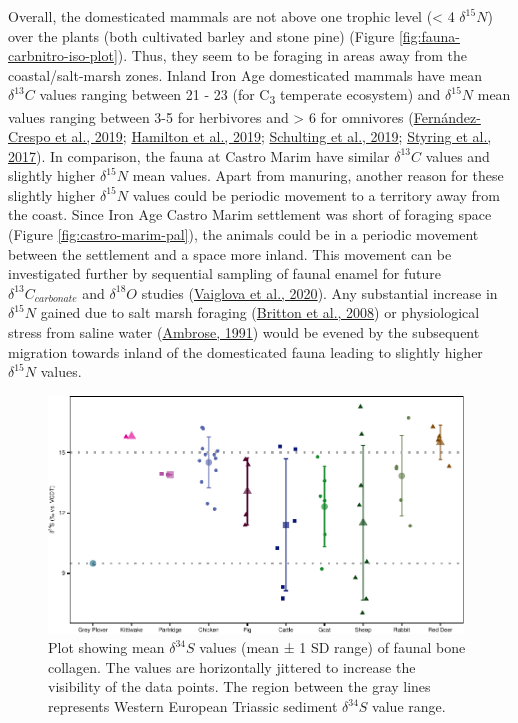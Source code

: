 \documentclass[3p]{elsarticle} %
\begin{document}
Overall, the domesticated mammals are not above one trophic level (\textless{} 4\text{\textperthousand} \(\delta^{15}N\)) over the plants (both cultivated barley and stone pine) (Figure \ref{fig:fauna-carbnitro-iso-plot}). Thus, they seem to be foraging in areas away from the coastal/salt-marsh zones. Inland Iron Age domesticated mammals have mean \(\delta ^{13}C\) values ranging between 21 - 23\text{\textperthousand} (for C\textsubscript{3} temperate ecosystem) and \(\delta ^{15}N\) mean values ranging between 3-5\text{\textperthousand} for herbivores and \textgreater{} 6\text{\textperthousand} for omnivores (\protect\hyperlink{ref-fernandez-crespo_etal19}{Fernández-Crespo et al., 2019}; \protect\hyperlink{ref-hamilton_etal19}{Hamilton et al., 2019}; \protect\hyperlink{ref-schulting_etal19}{Schulting et al., 2019}; \protect\hyperlink{ref-styring_etal17}{Styring et al., 2017}). In comparison, the fauna at Castro Marim have similar \(\delta ^{13}C\) values and slightly higher \(\delta ^{15}N\) mean values. Apart from manuring, another reason for these slightly higher \(\delta^{15}N\) values could be periodic movement to a territory away from the coast. Since Iron Age Castro Marim settlement was short of foraging space (Figure \ref{fig:castro-marim-pal}), the animals could be in a periodic movement between the settlement and a space more inland. This movement can be investigated further by sequential sampling of faunal enamel for future \(\delta^{13}C_{carbonate}\) and \(\delta^{18}O\) studies (\protect\hyperlink{ref-vaiglova_etal20}{Vaiglova et al., 2020}). Any substantial increase in \(\delta^{15}N\) gained due to salt marsh foraging (\protect\hyperlink{ref-britton_etal08}{Britton et al., 2008}) or physiological stress from saline water (\protect\hyperlink{ref-ambrose91}{Ambrose, 1991}) would be evened by the subsequent migration towards inland of the domesticated fauna leading to slightly higher \(\delta ^{15}N\) values.



\begin{figure}
\includegraphics[width=0.98\textwidth]{castro_main_body_files/figure-latex/fauna-sulph-iso-plot-1} \caption{Plot showing mean \(\delta ^{34}S\) values (mean ± 1 SD range) of faunal bone collagen. The values are horizontally jittered to increase the visibility of the data points. The region between the gray lines represents Western European Triassic sediment \(\delta ^{34}S\) value range.}\label{fig:fauna-sulph-iso-plot}
\end{figure}
\end{document}
